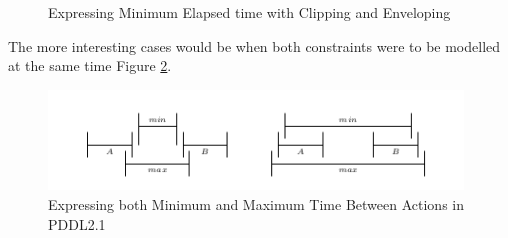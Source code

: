 \documentclass
[a4paper
,english
,parskip=half
,bibliography=totoc
]{scrreprt}
\begin{document}
        \begin{figure}[h]
                \hfill
                \vfill
                \centering 
                \caption{Expressing Minimum Elapsed time with Clipping and Enveloping}
                \label{fig:minimum_compact}
        \label{fig:minimum}
        \end{figure}


        The more interesting cases would be when both constraints were to be modelled at the same time Figure \ref{fig:maxandmin}. 

        \begin{figure}[!]
            \centering    
            \includegraphics[width=11cm]{max_min.png}
            \caption{Expressing both Minimum and Maximum Time Between Actions in PDDL2.1}
             \label{fig:maxandmin}
        \end{figure}
\end{document}
